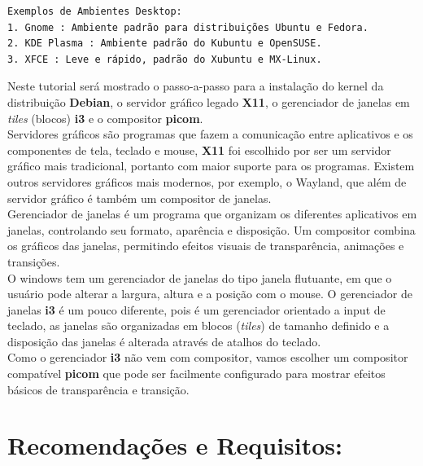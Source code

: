 \documentclass[12pt,a4paper]{article}
\begin{document}

\begin{lstlisting}
Exemplos de Ambientes Desktop:
1. Gnome : Ambiente padrão para distribuições Ubuntu e Fedora.
2. KDE Plasma : Ambiente padrão do Kubuntu e OpenSUSE. 
3. XFCE : Leve e rápido, padrão do Xubuntu e MX-Linux.
\end{lstlisting}

\vspace{\baselineskip}

Neste tutorial será mostrado o passo-a-passo para a instalação do kernel da distribuição \textbf{Debian}, o servidor gráfico legado \textbf{X11}, o gerenciador de janelas em \textit{tiles} (blocos) \textbf{i3} e o compositor \textbf{picom}.\\

Servidores gráficos são programas que fazem a comunicação entre aplicativos e os componentes de tela, teclado e mouse, \textbf{X11} foi escolhido por ser um servidor gráfico mais tradicional, portanto com maior suporte para os programas. Existem outros servidores gráficos mais modernos, por exemplo, o Wayland, que além de servidor gráfico é também um compositor de janelas. \\

Gerenciador de janelas é um programa que organizam os diferentes aplicativos em janelas, controlando seu formato, aparência e disposição. Um compositor combina os gráficos das janelas, permitindo efeitos visuais de transparência, animações e transições. \\

O windows tem um gerenciador de janelas do tipo janela flutuante, em que o usuário pode alterar a largura, altura e a posição com o mouse. O gerenciador de janelas \textbf{i3} é um pouco diferente, pois é um gerenciador orientado a input de teclado, as janelas são organizadas em blocos (\textit{tiles}) de tamanho definido e a disposição das janelas é alterada através de atalhos do teclado.\\

Como o gerenciador \textbf{i3} não vem com compositor, vamos escolher um compositor compatível \textbf{picom} que pode ser facilmente configurado para mostrar efeitos básicos de transparência e transição. 

\section*{Recomendações e Requisitos:}
\end{document}
